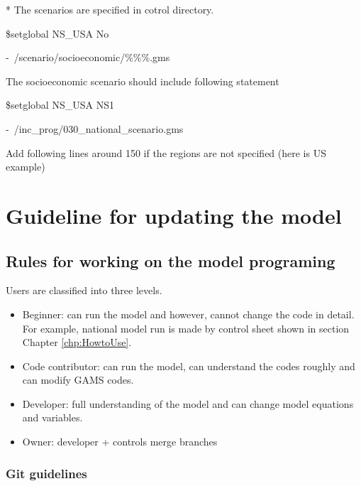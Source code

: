 \documentclass[10pt,a4paper,titlepage,dvipdfmx]{book}
\begin{document}
* The scenarios are specified in cotrol directory.

\$setglobal NS\_USA No

-~/scenario/socioeconomic/\%\%\%.gms

The socioeconomic scenario should include following statement

\$setglobal NS\_USA NS1

-~/inc\_prog/030\_national\_scenario.gms

Add following lines around 150 if the regions are not specified (here is US example)


\chapter{\label{chp:GuiChaMod}Guideline for updating the model}

\section{\label{sec:RulWorModPro}Rules for working on the model programing}

Users are classified into three levels.
\begin{itemize}
\item Beginner: can run the model and however, cannot change the code in detail. For example, national model run is made by control sheet shown in section Chapter \ref{chp:HowtoUse}.
\item Code contributor: can run the model, can understand the codes roughly and can modify GAMS codes. 
\item Developer: full understanding of the model and can change model equations and variables.
\item Owner: developer + controls merge branches
\end{itemize}

\subsection{\label{subsec:GitGuid}Git guidelines}
\end{document}
